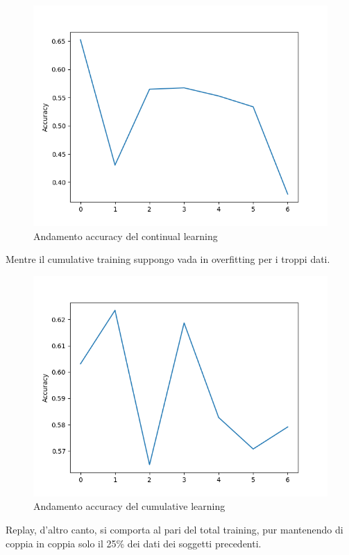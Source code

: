 \documentclass[11pt, a4paper, twoside, openright]{book}
\begin{document}
\begin{figure}
    \centering
    \includegraphics[scale=0.5]{img/cont6.png}
    \caption{Andamento accuracy del continual learning}
    \label{fig:cont6}
\end{figure}
Mentre il cumulative training suppongo vada in overfitting per i troppi dati.\\
\begin{figure}
    \centering
    \includegraphics[scale=0.5]{img/sum6.png}
    \caption{Andamento accuracy del cumulative learning}
    \label{fig:sum6}
\end{figure}
Replay, d'altro canto, si comporta al pari del total training, pur mantenendo di coppia in coppia solo il 25\% dei dati dei soggetti precedenti.\\
\end{document}
